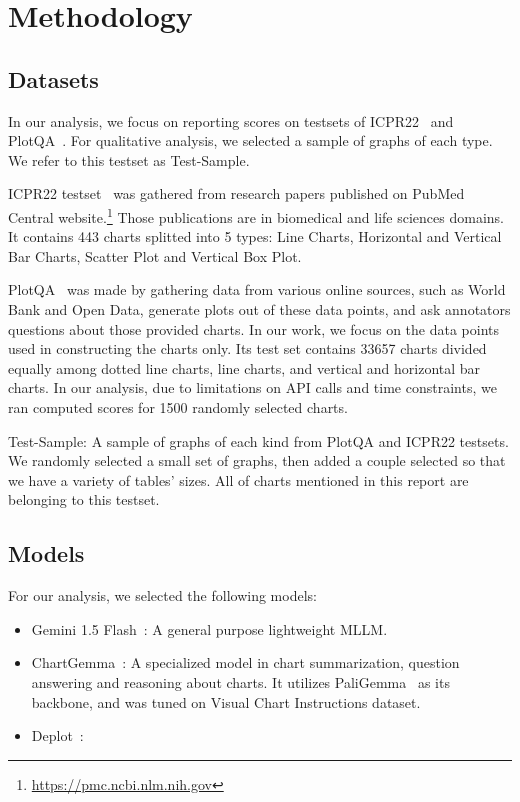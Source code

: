 \documentclass[
	letterpaper, %
]{jdf}
\begin{document}
\section{Methodology}\label{sect:methodology}
\subsection{Datasets}
In our analysis, we focus on reporting scores on testsets of ICPR22~\cite{rousseau2023pattern} and PlotQA~\cite{methani2020plotqa}.
For qualitative analysis, we selected a sample of graphs of each type.
We refer to this testset as Test-Sample.

ICPR22 testset~\cite{rousseau2023pattern} was gathered from research papers published on PubMed Central website.\footnote{\href{https://pmc.ncbi.nlm.nih.gov}{https://pmc.ncbi.nlm.nih.gov}}
Those publications are in biomedical and life sciences domains.
It contains 443 charts splitted into 5 types: Line Charts, Horizontal and Vertical Bar Charts, Scatter Plot and Vertical Box Plot.

PlotQA~\cite{methani2020plotqa} was made by gathering data from various online sources, such as World Bank and Open Data, generate plots out of these data points, and ask annotators questions about those provided charts.
In our work, we focus on the data points used in constructing the charts only.
Its test set contains 33657 charts divided equally among dotted line charts, line charts, and vertical and horizontal bar charts.
In our analysis, due to limitations on API calls and time constraints, we ran computed scores for 1500 randomly selected charts.

Test-Sample: A sample of graphs of each kind from PlotQA and ICPR22 testsets.
We randomly selected a small set of graphs, then added a couple selected so that we have a variety of tables' sizes.
All of charts mentioned in this report are belonging to this testset.

\subsection{Models}\label{ssect:models}
For our analysis, we selected the following models:
\begin{itemize}
    \item Gemini 1.5 Flash~\cite{team2024gemini}: A general purpose lightweight MLLM.
         \item ChartGemma~\cite{masry2024chartgemma}: A specialized model in chart summarization, question answering and reasoning about charts.
             It utilizes PaliGemma~\cite{beyer2024paligemma} as its backbone, and was tuned on Visual Chart Instructions dataset.
         \item Deplot~\cite{liu2022deplot}: 
              \end{itemize}
\end{document}
